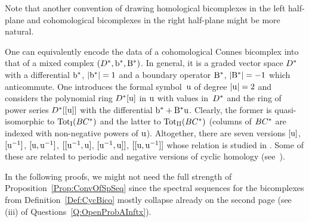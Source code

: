 \documentclass[\MainFolder/Text.tex]{subfiles}
\begin{document}
Note that another convention of drawing homological bicomplexes in the left half-plane and cohomological bicomplexes in the right half-plane might be more natural.
\begin{Remark}\label{Rem:MixedCompl}
One can equivalently encode the data of a cohomological Connes bicomplex into that of a mixed complex $(D^*,\mathrm{b}^*,\mathrm{B}^*)$. In general, it is a graded vector space $D^*$ with a differential $\mathrm{b}^*$, $|\mathrm{b}^*|=1$ and a boundary operator $\mathrm{B}^*$, $|\mathrm{B}^*|=-1$ which anticommute. One introduces the formal symbol~$\mathrm{u}$ of degree $|\mathrm{u}|= 2$ and considers the polynomial ring $D^*[\mathrm{u}]$ in $\mathrm{u}$ with values in~$D^*$ and the ring of power series $D^*[[\mathrm{u}]]$ with the differential $\mathrm{b}^* + \mathrm{B}^*\mathrm{u}$. Clearly, the former is quasi-isomorphic to ${\mathrm{Tot}_{\mathrm{I}}}(BC^{*})$ and the latter to ${\mathrm{Tot}_{\mathrm{II}}}(BC^{*})$ (columns of $BC^{*}$ are indexed with non-negative powers of $\mathrm{u}$).
Altogether, there are seven versions $[\mathrm{u}]$, $[\mathrm{u}^{-1}]$, $[\mathrm{u},\mathrm{u}^{-1}]$, $[[\mathrm{u}^{-1},\mathrm{u}]$, $[\mathrm{u}^{-1},\mathrm{u}]]$, $[[\mathrm{u},\mathrm{u}^{-1}]]$ whose relation is studied in \cite{Cieliebak2018b}. Some of these are related to periodic and negative versions of cyclic homology (see~\cite{LodayCyclic}).
\end{Remark}
In the following proofs, we might not need the full strength of Proposition~\ref{Prop:ConvOfSpSeq} since the spectral sequences for the bicomplexes from Definition~\ref{Def:CycBico} mostly collapse already on the second page (see (iii) of Questions~\ref{Q:OpenProbAInftx}).
\end{document}
